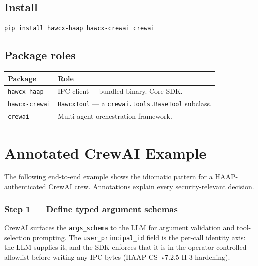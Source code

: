 \documentclass[11pt, a4paper]{article}
\newcommand{\pkg}[1]{\texttt{#1}}
\newcommand{\code}[1]{\texttt{#1}}
\begin{document}
\subsection{Install}

\begin{lstlisting}[language=bash, numbers=none, frame=none, backgroundcolor=\color{codebg}]
pip install hawcx-haap hawcx-crewai crewai
\end{lstlisting}

\subsection{Package roles}

\begin{table}[h!]
\centering
\renewcommand{\arraystretch}{1.2}
\begin{tabular}{@{} l X @{}}
\toprule
\textbf{Package} & \textbf{Role} \\
\midrule
\pkg{hawcx-haap}   & IPC client + bundled binary. Core SDK. \\
\pkg{hawcx-crewai} & \code{HawcxTool} --- a \code{crewai.tools.BaseTool} subclass. \\
\pkg{crewai}       & Multi-agent orchestration framework. \\
\bottomrule
\end{tabular}
\end{table}

\section{Annotated CrewAI Example}

The following end-to-end example shows the idiomatic pattern for a
HAAP-authenticated CrewAI crew. Annotations explain every security-relevant
decision.

\subsubsection*{Step 1 — Define typed argument schemas}

CrewAI surfaces the \code{args\_schema} to the LLM for argument validation and
tool-selection prompting. The \code{user\_principal\_id} field is the per-call
identity axis: the LLM supplies it, and the SDK enforces that it is in the
operator-controlled allowlist before writing any IPC bytes (HAAP CS~v7.2.5
H-3 hardening).
\end{document}
